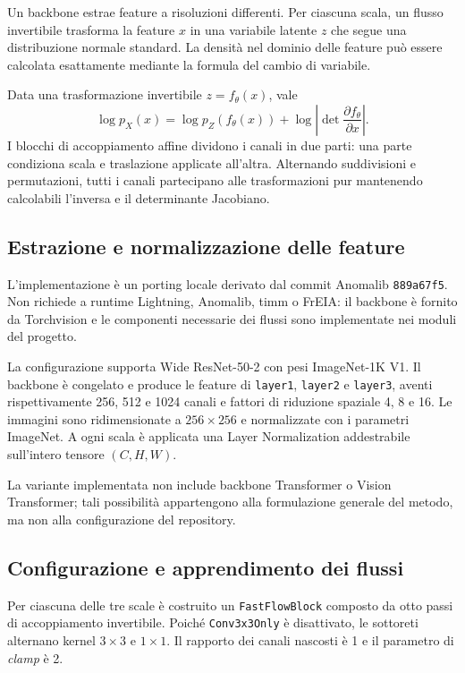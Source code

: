 Un backbone estrae feature a risoluzioni differenti. Per ciascuna scala, un flusso invertibile trasforma la feature $x$ in una variabile latente $z$ che segue una distribuzione normale standard. La densità nel dominio delle feature può essere calcolata esattamente mediante la formula del cambio di variabile.

Data una trasformazione invertibile $z=f_{\theta}(x)$, vale
\begin{equation}
    \log p_X(x)=\log p_Z(f_{\theta}(x))+
    \log\left|\det\frac{\partial f_{\theta}}{\partial x}\right|.
    \label{eq:cap3-fastflow-cov}
\end{equation}
I blocchi di accoppiamento affine dividono i canali in due parti: una parte condiziona scala e traslazione applicate all'altra. Alternando suddivisioni e permutazioni, tutti i canali partecipano alle trasformazioni pur mantenendo calcolabili l'inversa e il determinante Jacobiano.

\subsection{Estrazione e normalizzazione delle feature}

L'implementazione è un porting locale derivato dal commit Anomalib \texttt{889a67f5}. Non richiede a runtime Lightning, Anomalib, timm o FrEIA: il backbone è fornito da Torchvision e le componenti necessarie dei flussi sono implementate nei moduli del progetto.

La configurazione supporta Wide ResNet-50-2 con pesi ImageNet-1K V1. Il backbone è congelato e produce le feature di \texttt{layer1}, \texttt{layer2} e \texttt{layer3}, aventi rispettivamente 256, 512 e 1024 canali e fattori di riduzione spaziale 4, 8 e 16. Le immagini sono ridimensionate a $256\times256$ e normalizzate con i parametri ImageNet. A ogni scala è applicata una Layer Normalization addestrabile sull'intero tensore $(C,H,W)$.

La variante implementata non include backbone Transformer o Vision Transformer; tali possibilità appartengono alla formulazione generale del metodo, ma non alla configurazione del repository.

\subsection{Configurazione e apprendimento dei flussi}

Per ciascuna delle tre scale è costruito un \texttt{FastFlowBlock} composto da otto passi di accoppiamento invertibile. Poiché \texttt{Conv3x3Only} è disattivato, le sottoreti alternano kernel $3\times3$ e $1\times1$. Il rapporto dei canali nascosti è 1 e il parametro di \textit{clamp} è 2.

